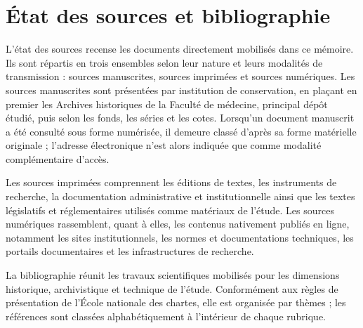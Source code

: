 


\chapter*{État des sources et bibliographie}

\noindent
L'état des sources recense les documents directement mobilisés dans ce mémoire. Ils sont répartis en trois ensembles selon leur nature et leurs modalités de transmission : sources manuscrites, sources imprimées et sources numériques. Les sources manuscrites sont présentées par institution de conservation, en plaçant en premier les Archives historiques de la Faculté de médecine, principal dépôt étudié, puis selon les fonds, les séries et les cotes. Lorsqu'un document manuscrit a été consulté sous forme numérisée, il demeure classé d'après sa forme matérielle originale ; l'adresse électronique n'est alors indiquée que comme modalité complémentaire d'accès.

\medskip

\noindent
Les sources imprimées comprennent les éditions de textes, les instruments de recherche, la documentation administrative et institutionnelle ainsi que les textes législatifs et réglementaires utilisés comme matériaux de l'étude. Les sources numériques rassemblent, quant à elles, les contenus nativement publiés en ligne, notamment les sites institutionnels, les normes et documentations techniques, les portails documentaires et les infrastructures de recherche.

\medskip

\noindent
La bibliographie réunit les travaux scientifiques mobilisés pour les dimensions historique, archivistique et technique de l'étude. Conformément aux règles de présentation de l'École nationale des chartes, elle est organisée par thèmes ; les références sont classées alphabétiquement à l'intérieur de chaque rubrique.

